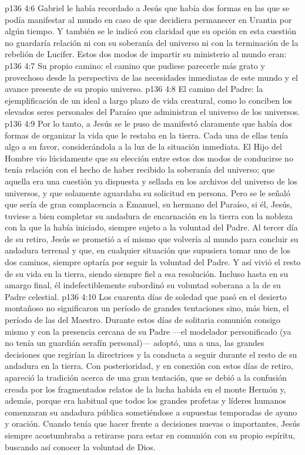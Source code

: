 \vs p136 4:6 Gabriel le había recordado a Jesús que había dos formas en las que se podía manifestar al mundo en caso de que decidiera permanecer en Urantia por algún tiempo. Y también se le indicó con claridad que su opción en esta cuestión no guardaría relación ni con su soberanía del universo ni con la terminación de la rebelión de Lucifer. Estos dos modos de impartir su ministerio al mundo eran:
\vs p136 4:7 Su propio camino: el camino que pudiese parecerle más grato y provechoso desde la perspectiva de las necesidades inmediatas de este mundo y el avance presente de su propio universo.
\vs p136 4:8 El camino del Padre: la ejemplificación de un ideal a largo plazo de vida creatural, como lo conciben los elevados seres personales del Paraíso que administran el universo de los universos.
\vs p136 4:9 Por lo tanto, a Jesús se le puso de manifestó claramente que había dos formas de organizar la vida que le restaba en la tierra. Cada una de ellas tenía algo a su favor, considerándola a la luz de la situación inmediata. El Hijo del Hombre vio lúcidamente que su elección entre estos dos modos de conducirse no tenía relación con el hecho de haber recibido la soberanía del universo; que aquella era una cuestión ya dispuesta y sellada en los archivos del universo de los universos, y que solamente aguardaba su solicitud en persona. Pero se le señaló que sería de gran complacencia a Emanuel, su hermano del Paraíso, si él, Jesús, tuviese a bien completar su andadura de encarnación en la tierra con la nobleza con la que la había iniciado, siempre sujeto a la voluntad del Padre. Al tercer día de su retiro, Jesús se prometió a sí mismo que volvería al mundo para concluir su andadura terrenal y que, en cualquier situación que supusiera tomar uno de los dos caminos, siempre optaría por seguir la voluntad del Padre. Y así vivió el resto de su vida en la tierra, siendo siempre fiel a esa resolución. Incluso hasta en su amargo final, él indefectiblemente subordinó su voluntad soberana a la de su Padre celestial.
\vs p136 4:10 \pc Los cuarenta días de soledad que pasó en el desierto montañoso no significaron un período de grandes tentaciones sino, más bien, el período de las  del Maestro. Durante estos días de solitaria comunión consigo mismo y con la presencia cercana de su Padre ---el modelador personificado (ya no tenía un guardián serafín personal)--- adoptó, una a una, las grandes decisiones que regirían la directrices y la conducta a seguir durante el resto de su andadura en la tierra. Con posterioridad, y en conexión con estos días de retiro, apareció la tradición acerca de una gran tentación, que se debió a la confusión creada por los fragmentados relatos de la lucha habida en el monte Hermón y, además, porque era habitual que todos los grandes profetas y líderes humanos comenzaran su andadura pública sometiéndose a supuestas temporadas de ayuno y oración. Cuando tenía que hacer frente a decisiones nuevas o importantes, Jesús siempre acostumbraba a retirarse para estar en comunión con su propio espíritu, buscando así conocer la voluntad de Dios.
